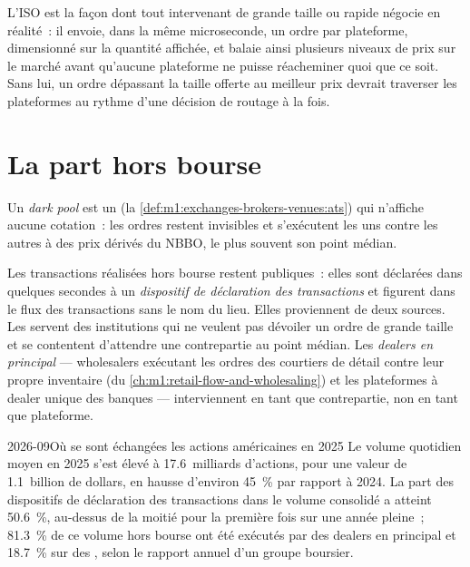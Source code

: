 L'ISO est la façon dont tout intervenant de grande taille ou rapide négocie en réalité~: il envoie, dans
la même microseconde, un ordre par plateforme, dimensionné sur la quantité affichée,
et balaie ainsi plusieurs niveaux de prix sur le marché avant qu'aucune plateforme ne puisse
réacheminer quoi que ce soit. Sans lui, un ordre dépassant la taille offerte au meilleur
prix devrait traverser les plateformes au rythme d'une décision de routage à la fois.

\section{La part hors bourse}

\begin{definition}\label{def:m1:us-equity-market-structure:dark}
Un \emph{dark pool} est un 
(la \cref{def:m1:exchanges-brokers-venues:ats}) qui n'affiche aucune cotation~:
les ordres restent invisibles et s'exécutent les uns contre les autres à des prix dérivés du
NBBO, le plus souvent son point médian.
\end{definition}

Les transactions réalisées hors bourse restent publiques~: elles sont déclarées dans
quelques secondes à un \emph{dispositif de déclaration des transactions} et figurent dans le flux des transactions sans
le nom du lieu. Elles proviennent de deux sources. Les  servent
des institutions qui ne veulent pas dévoiler un ordre de grande taille et se contentent
d'attendre une contrepartie au point médian. Les \emph{dealers en principal} --- wholesalers
exécutant les ordres des courtiers de détail contre leur propre inventaire
(du \cref{ch:m1:retail-flow-and-wholesaling}) et les plateformes à dealer unique des banques
--- interviennent en tant que contrepartie, non en tant que plateforme.

\begin{dated}{2026-09}{Où se sont échangées les actions américaines en 2025}\label{dat:m1:us-equity-market-structure:where}
Le volume quotidien moyen en 2025 s'est élevé à 17.6~milliards d'actions, pour une valeur de 1.1~billion de dollars, en hausse
d'environ 45~\% par rapport à 2024. La part des dispositifs de déclaration des transactions dans le volume consolidé
a atteint 50.6~\%, au-dessus de la moitié pour la première fois sur une année pleine~;
81.3~\% de ce volume hors bourse ont été exécutés par des dealers en principal et
18.7~\% sur des , selon le rapport annuel
d'un groupe boursier.
\end{dated}

